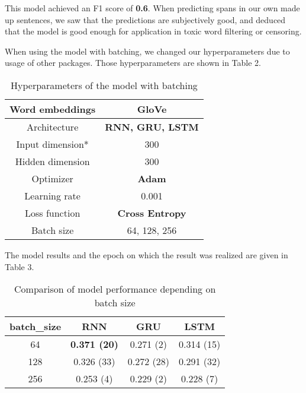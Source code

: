 \documentclass{article}
\begin{document}
This model achieved an F1 score of \textbf{0.6}. When predicting spans in our own made up sentences, we saw that the predictions are subjectively good, and deduced that the model is good enough for application in toxic word filtering or censoring. 


When using the model with batching, we changed our hyperparameters due to usage of other packages. Those hyperparameters are shown in Table 2.

\begin{table}[h!]
	\begin{center}
		\caption{Hyperparameters of the model with batching}
		\begin{tabular}{| c | c |}
			\hline
			Word embeddings & \textbf{GloVe} \\
			\hline
			Architecture & \textbf{RNN, GRU, LSTM} \\
			\hline
			Input dimension* & 300 \\
			\hline
			Hidden dimension & 300 \\
			\hline
			Optimizer & \textbf{Adam} \\
			\hline
			Learning rate & 0.001 \\
			\hline
			Loss function & \textbf{Cross Entropy} \\
			\hline
			Batch size & 64, 128, 256 \\
			\hline
		\end{tabular}
	\end{center}
	\label{hyper2}
\end{table}

The model results and the epoch on which the result was realized are given in Table 3.


\begin{table}[h!]
	\caption{Comparison of model performance depending on batch size}
	\begin{center}
		\begin{tabular}{| c | c | c | c |} 
			\hline
			 batch\_size& RNN & GRU & LSTM \\
			\hline
			64 & \textbf{0.371 (20)} & 0.271 (2) & 0.314 (15) \\ 
			\hline
			128 & 0.326 (33) & 0.272 (28) & 0.291 (32) \\
			\hline
			256 & 0.253 (4) & 0.229 (2) & 0.228 (7) \\
			\hline
		\end{tabular}
	\end{center}
	\label{tab:gridsearch}
\end{table}
\end{document}
